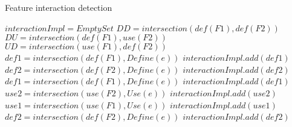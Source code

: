 \begin{algorithm}
\caption{Feature interaction detection}	
 \label{alg_2}
\begin{algorithmic}[1]
\State $interactionImpl = EmptySet$
\State $DD = intersection(def(F1), def(F2))$
\State $DU = intersection(def(F1), use(F2))$
\State $UD = intersection(use(F1), def(F2))$
	\State $def1 = intersection(def(F1), Define(e))$
	\State $interactionImpl.add(def1)$
	\State $def2 = intersection(def(F2), Define(e))$
	\State $interactionImpl.add(def2)$
\EndFor
{}
	\State $def1 = intersection(def(F1), Define(e))$
	\State $interactionImpl.add(def1)$
	\State $use2 = intersection(use(F2), Use(e))$
	\State $interactionImpl.add(use2)$
\EndFor
{}
	\State $use1 = intersection(use(F1), Use(e))$
	\State $interactionImpl.add(use1)$
	\State $def2 = intersection(def(F2), Define(e))$
	\State $interactionImpl.add(def2)$
\EndFor
\EndProcedure
\Statex
\end{algorithmic}
\end{algorithm}